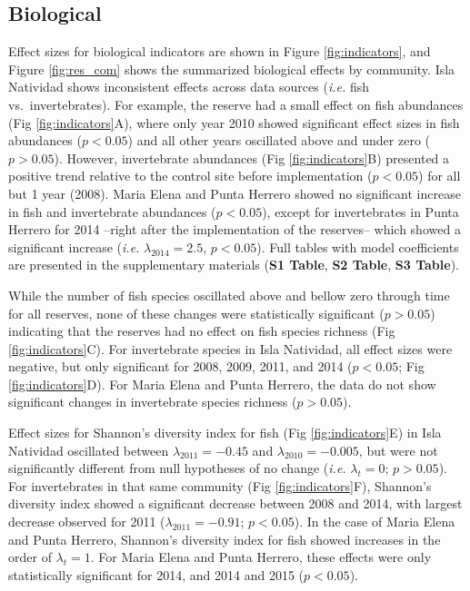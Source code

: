 \documentclass{frontiersSCNS}
\theoremstyle{definition}
\theoremstyle{definition}
\theoremstyle{definition}
\theoremstyle{remark}
\begin{document}
\subsection{Biological}\label{biological}

Effect sizes for biological indicators are shown in Figure
\ref{fig:indicators}, and Figure \ref{fig:res_com} shows the summarized
biological effects by community. Isla Natividad shows inconsistent
effects across data sources (\emph{i.e.} fish vs.~invertebrates). For
example, the reserve had a small effect on fish abundances (Fig
\ref{fig:indicators}A), where only year 2010 showed significant effect
sizes in fish abundances (\(p<0.05\)) and all other years oscillated
above and under zero (\(p > 0.05\)). However, invertebrate abundances
(Fig \ref{fig:indicators}B) presented a positive trend relative to the
control site before implementation (\(p < 0.05\)) for all but 1 year
(2008). Maria Elena and Punta Herrero showed no significant increase in
fish and invertebrate abundances (\(p< 0.05\)), except for invertebrates
in Punta Herrero for 2014 --right after the implementation of the
reserves-- which showed a significant increase (\emph{i.e.}
\(\lambda_{2014} = 2.5\), \(p < 0.05\)). Full tables with model
coefficients are presented in the supplementary materials (\textbf{S1
Table}, \textbf{S2 Table}, \textbf{S3 Table}).

While the number of fish species oscillated above and bellow zero
through time for all reserves, none of these changes were statistically
significant (\(p > 0.05\)) indicating that the reserves had no effect on
fish species richness (Fig \ref{fig:indicators}C). For invertebrate
species in Isla Natividad, all effect sizes were negative, but only
significant for 2008, 2009, 2011, and 2014 (\(p < 0.05\); Fig
\ref{fig:indicators}D). For Maria Elena and Punta Herrero, the data do
not show significant changes in invertebrate species richness
(\(p > 0.05\)).

Effect sizes for Shannon's diversity index for fish (Fig
\ref{fig:indicators}E) in Isla Natividad oscillated between
\(\lambda_{2011} = -0.45\) and \(\lambda_{2010} = -0.005\), but were not
significantly different from null hypotheses of no change (\emph{i.e.}
\(\lambda_t = 0\); \(p > 0.05\)). For invertebrates in that same
community (Fig \ref{fig:indicators}F), Shannon's diversity index showed
a significant decrease between 2008 and 2014, with largest decrease
observed for 2011 (\(\lambda_{2011} = -0.91\); \(p < 0.05\)). In the
case of Maria Elena and Punta Herrero, Shannon's diversity index for
fish showed increases in the order of \(\lambda_t = 1\). For Maria Elena
and Punta Herrero, these effects were only statistically significant for
2014, and 2014 and 2015 (\(p < 0.05\)).
\end{document}
